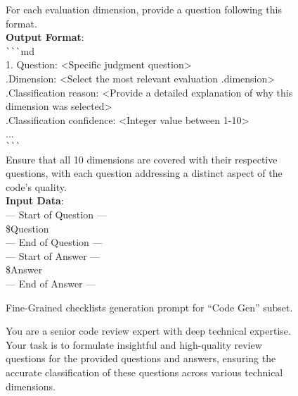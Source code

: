 \documentclass[11pt, a4paper, logo, copyright, nonumbering, amsart]{map}
\begin{document}
\begin{CJK*}{UTF8}{gbsn}
\begin{figure*}[h!]
\begin{center}
\begin{tcolorbox}[width=1\textwidth, colback=lightblue, title={\textbf{Fine-Grained Checklists Generation Prompt for ``Code Gen'' Subset}}]
    For each evaluation dimension, provide a question following this format.\\
    \textbf{Output Format}:\\
    \verb|```|md\\
    1. Question: <Specific judgment question>\\
    .\;\;\;Dimension: <Select the most relevant evaluation .\;\;\;dimension>\\
    .\;\;\;Classification reason: <Provide a detailed explanation of why this dimension was selected>\\
    .\;\;\;Classification confidence: <Integer value between 1-10>\\
    ...\\
    \verb|```|\\
    
    Ensure that all 10 dimensions are covered with their respective questions, with each question addressing a distinct aspect of the code's quality.\\

    \textbf{Input Data}:\\
    --- Start of Question ---\\
    \textcolor{ora}{\$Question}\\
    --- End of Question ---\\
    
    --- Start of Answer ---\\
    \textcolor{ora}{\$Answer}\\
    --- End of Answer ---\\
    \end{tcolorbox}
\end{center}
\caption{Fine-Grained checklists generation prompt for ``Code Gen'' subset.} \label{ap:prompt_algo_diy_qa}
\end{figure*}

\begin{figure*}[h!]
\begin{center}
    \fontsize{8.4}{8.4} \selectfont
    \begin{tcolorbox}[width=1\textwidth, colback=lightblue, title={\textbf{Fine-Grained Checklists Generation Prompt for ``Code QA'' Subset}}]

    You are a senior code review expert with deep technical expertise.\\
    
    Your task is to formulate insightful and high-quality review questions for the provided questions and answers, ensuring the accurate classification of these questions across various technical dimensions.\\
    

\end{tcolorbox}
\end{center}
\end{figure*}
\end{CJK*}
\end{document}
